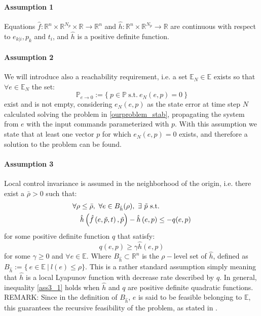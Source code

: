 \paragraph{Assumption 1} Equations $\hat{f}: \mathbb{R}^n\times\mathbb{R}^{N_p}\times\mathbb{R}\rightarrow\mathbb{R}^n$ and $\hat{h}: \mathbb{R}^n\times\mathbb{R}^{N_p}\rightarrow\mathbb{R}$ are continuous with respect to $e_{k|i},p_k$ and $t_i$, and $\hat{h}$ is a positive definite function. 

\paragraph{Assumption 2} We will introduce also a reachability requirement, i.e. a set $\mathbb{E}_N\in\mathbb{E}$ exists so that $\forall e \in \mathbb{E}_N $ the set:
\begin{equation*}
	\mathbb{P}_{e \to 0}:=\lbrace \ p \in \mathbb{P}\ \text{s.t.}\ e_{N}(e,p)=0\ \rbrace
\end{equation*} exist and is not empty, considering $e_{N}(e,p)$ as the state error at time step $N$ calculated solving the problem in \ref{ourproblem_stab}, propagating the system from $e$ with the input commands parameterized with $p$. With this assumption we state that at least one vector $p$ for which $e_{N}(e,p)=0$ exists, and therefore a solution to the problem can be found.

\paragraph{Assumption 3} Local control invariance is assumed in the neighborhood of the origin, i.e. there exist a $\bar{\rho} > 0$ such that:
\begin{equation}
	\begin{split}
		\forall \rho &\leq \bar{\rho},\ \forall e \in B_{\hat{h}}(\rho),\ \exists\ \tilde{p}\ 	 \textnormal{s.t.} \\
		&\hat{h}\left(\hat{f}\left(e,\tilde{p},t\right),\tilde{p}\right)-\hat{h}\left(e,p\right) \leq -q(e,p) 
		\label{ass3}
	\end{split}
\end{equation}
for some positive definite function $q$ that satisfy:
\begin{equation}
	q(e,p) \ge \gamma \hat{h}(e,p)
	\label{ass3_1} 
\end{equation}
for some $\gamma \geq 0$ and $\forall e \in \mathbb{E}$.
Where $B_{\hat{h}} \subset \mathbb{R}^n$ is the $\rho-$level set of $\hat{h}$, defined as $B_{\hat{h}} := \lbrace\ e \in \mathbb{E}\ |\ l(e) \leq \rho \rbrace$. This is a rather standard assumption simply meaning that $\hat{h}$ is a local Lyapunov function with decrease rate described by $q$. In general, inequality \ref{ass3_1} holds when $\hat{h}$ and $q$ are positive definite quadratic functions.
\\{REMARK:  } Since in the definition of $B_{\hat{h}}$, $e$ is said to be feasible belonging to $\mathbb{E}$, this guarantees the recursive feasibility of the problem, as stated in \cite{alamir2018stability}.

